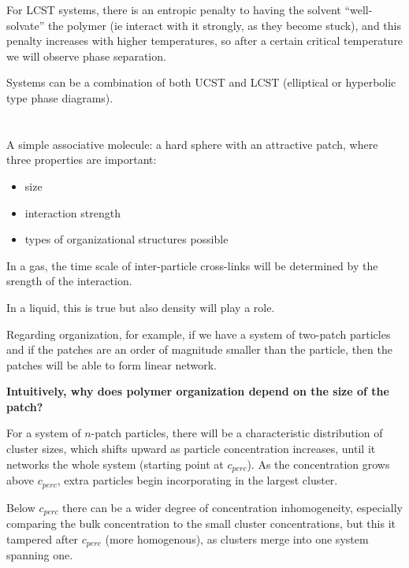 \documentclass{article}
\begin{document}
For LCST systems, there is an entropic penalty to having the solvent ``well-solvate'' the polymer (ie interact with it strongly, as they become stuck), and this penalty increases with higher temperatures, so after a certain critical temperature we will observe phase separation.

Systems can be a combination of both UCST and LCST (elliptical or hyperbolic type phase diagrams).

\section{}

\subsection{}

A simple associative molecule: a hard sphere with an attractive patch, where three properties are important:

\begin{itemize}
    \item size
    \item interaction strength
    \item types of organizational structures possible
\end{itemize}

In a gas, the time scale of inter-particle cross-links will be determined by the srength of the interaction.

In a liquid, this is true but also density will play a role.

Regarding organization, for example, if we have a system of two-patch particles and if the patches are an order of magnitude smaller than the particle, then the patches will be able to form linear network.

\textbf{Intuitively, why does polymer organization depend on the size of the patch?}

For a system of $n$-patch particles, there will be a characteristic distribution of cluster sizes, which shifts upward as particle concentration increases, until it networks the whole system (starting point at $c_{perc}$). As the concentration grows above $c_{perc}$, extra particles begin incorporating in the largest cluster.

Below $c_{perc}$ there can be a wider degree of concentration inhomogeneity, especially comparing the bulk concentration to the small cluster concentrations, but this it tampered after $c_{perc}$ (more homogenous), as clusters merge into one system spanning one.
\end{document}
